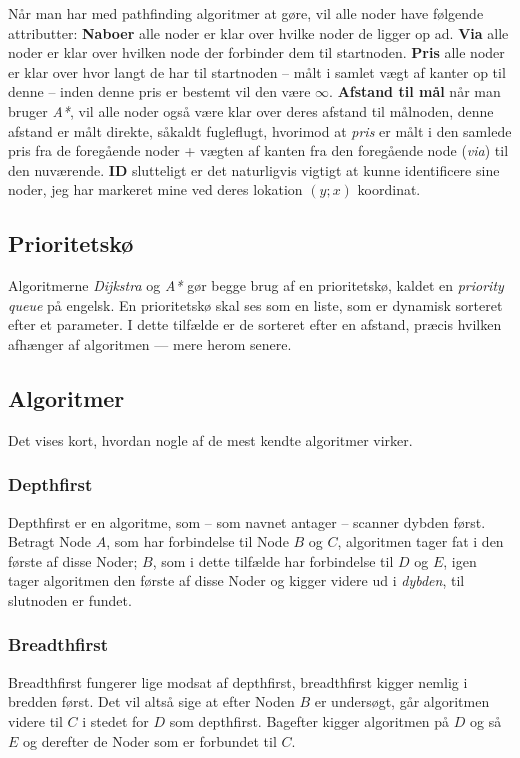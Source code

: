\documentclass[a4paper, 12pt]{article}
\begin{document}
Når man har med pathfinding algoritmer at gøre, vil alle noder have følgende attributter: \textbf{Naboer} alle noder er klar over hvilke noder de ligger op ad. \textbf{Via} alle noder er klar over hvilken node der forbinder dem til startnoden. \textbf{Pris} alle noder er klar over hvor langt de har til startnoden -- målt i samlet vægt af kanter op til denne -- inden denne pris er bestemt vil den være $\infty$. \textbf{Afstand til mål} når man bruger \textit{A*}, vil alle noder også være klar over deres afstand til målnoden, denne afstand er målt direkte, såkaldt fugleflugt, hvorimod at \textit{pris} er målt i den samlede pris fra de foregående noder + vægten af kanten fra den foregående node (\textit{via}) til den nuværende. \textbf{ID} slutteligt er det naturligvis vigtigt at kunne identificere sine noder, jeg har markeret mine ved deres lokation $(y; x)$ koordinat.

\subsection{Prioritetskø}\label{subsec:pq}
Algoritmerne \textit{Dijkstra} og \textit{A*} gør begge brug af en prioritetskø, kaldet en \textit{priority queue} på engelsk. En prioritetskø skal ses som en liste, som er dynamisk sorteret efter et parameter. I dette tilfælde er de sorteret efter en afstand, præcis hvilken afhænger af algoritmen --- mere herom senere.

\subsection{Algoritmer}
Det vises kort, hvordan nogle af de mest kendte algoritmer virker.
\subsubsection{Depthfirst}
Depthfirst er en algoritme, som -- som navnet antager -- scanner dybden først. Betragt Node $A$, som har forbindelse til Node $B$ og $C$, algoritmen tager fat i den første af disse Noder; $B$, som i dette tilfælde har forbindelse til $D$ og $E$, igen tager algoritmen den første af disse Noder og kigger videre ud i \textit{dybden}, til slutnoden er fundet.
\subsubsection{Breadthfirst}
Breadthfirst fungerer lige modsat af depthfirst, breadthfirst kigger nemlig i bredden først. Det vil altså sige at efter Noden $B$ er undersøgt, går algoritmen videre til $C$ i stedet for $D$ som depthfirst. Bagefter kigger algoritmen på $D$ og så $E$ og derefter de Noder som er forbundet til $C$.
\end{document}
